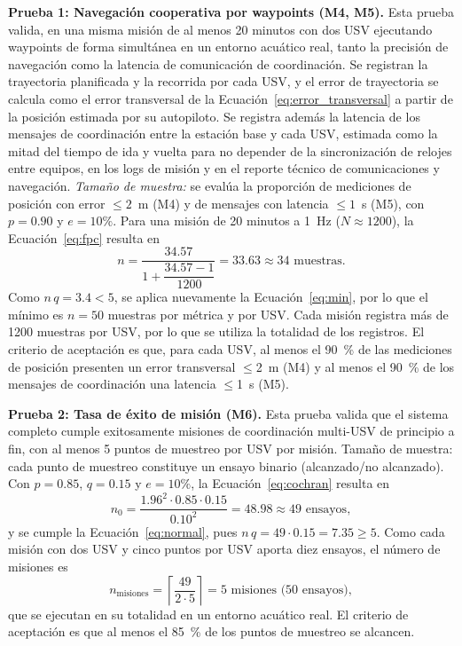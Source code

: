 \textbf{Prueba 1: Navegación cooperativa por waypoints (M4, M5).} Esta prueba valida, 
en una misma misión de al menos 20 minutos con dos USV ejecutando waypoints de forma simultánea 
en un entorno acuático real, tanto la precisión de navegación como la latencia de comunicación de 
coordinación. Se registran la trayectoria planificada y la recorrida por cada USV, y el error de trayectoria 
se calcula como el error transversal de la Ecuación~\ref{eq:error_transversal} a partir de la posición estimada 
por su autopiloto. Se registra además la latencia de los mensajes de coordinación entre la estación base y 
cada USV, estimada como la mitad del tiempo de ida y 
vuelta para no depender de la sincronización de relojes entre equipos, en los logs de misión y 
en el reporte técnico de comunicaciones y navegación.
\emph{Tamaño de muestra:} se evalúa la proporción de mediciones de posición con error
$\leq 2$~m (M4) y de mensajes con latencia $\leq 1$~s (M5), con $p = 0.90$ y $e = 10\%$. Para
una misión de 20 minutos a 1~Hz ($N \approx 1200$), la Ecuación~\eqref{eq:fpc} resulta en
\begin{equation*}
  n = \frac{34.57}{1 + \dfrac{34.57 - 1}{1200}} = 33.63 \approx 34 \text{ muestras.}
\end{equation*}
Como $n\,q = 3.4 < 5$, se aplica nuevamente la Ecuación~\eqref{eq:min}, por lo que el mínimo
es $n = 50$ muestras por métrica y por USV. Cada misión registra más de 1200 muestras por
USV, por lo que se utiliza la totalidad de los registros. El criterio de aceptación es que, para 
cada USV, al menos el 90~\% de las mediciones de posición presenten un error transversal $\leq$2~m (M4) y 
al menos el 90~\% de los mensajes de coordinación una latencia $\leq$1~s (M5).

\textbf{Prueba 2: Tasa de éxito de misión (M6).} Esta prueba valida que el sistema completo 
cumple exitosamente misiones de coordinación multi-USV de principio a fin, con al menos 5 
puntos de muestreo por USV por misión. Tamaño de muestra: cada punto de muestreo constituye un 
ensayo binario (alcanzado/no alcanzado). Con $p = 0.85$, $q = 0.15$ y $e = 10\%$, la 
Ecuación~\eqref{eq:cochran} resulta en
\[
n_0 = \frac{1.96^2 \cdot 0.85 \cdot 0.15}{0.10^2} = 48.98 \approx 49 \text{ ensayos},
\]
y se cumple la Ecuación~\eqref{eq:normal}, pues $n\,q = 49 \cdot 0.15 = 7.35 \geq 5$. Como 
cada misión con dos USV y cinco puntos por USV aporta diez ensayos, el número de misiones es
\[
n_{\text{misiones}} = \left\lceil \frac{49}{2 \cdot 5} \right\rceil = 5 \text{ misiones (50 ensayos)},
\]
que se ejecutan en su totalidad en un entorno acuático real. El criterio de aceptación es que al menos 
el 85~\% de los puntos de muestreo se alcancen.

